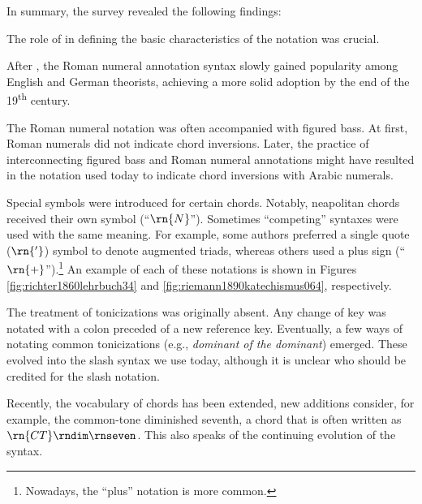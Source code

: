 In summary, the survey revealed the following findings:

The role of \textcite{weber1818versuch} in defining the
basic characteristics of the notation was crucial.


After \textcite{weber1818versuch}, the Roman numeral
annotation syntax slowly gained popularity among English and
German theorists, achieving a more solid adoption by the end
of the 19\textsuperscript{th} century.

 The Roman numeral notation was often accompanied with
figured bass. At first, Roman numerals did not indicate
chord inversions. Later, the practice of interconnecting
figured bass and Roman numeral annotations might have
resulted in the notation used today to indicate chord
inversions with Arabic numerals.

Special symbols were introduced for certain chords. Notably,
\gls{neapolitan} chords received their own symbol
(``$\rn{N}$''). Sometimes ``competing'' syntaxes were used
with the same meaning. For example, some authors preferred a
single quote ($\rn{'}$) symbol to denote augmented triads,
whereas others used a plus sign
(``$\rn{+}$'').\footnote{Nowadays, the ``plus'' notation is
more common.} An example of each of these notations is shown
in Figures \ref{fig:richter1860lehrbuch34} and
\ref{fig:riemann1890katechismus064}, respectively.

The treatment of tonicizations was originally absent. Any
change of key was notated with a colon preceded of a new
reference key. Eventually, a few ways of notating common
tonicizations (e.g., \emph{dominant of the dominant})
emerged. These evolved into the slash syntax we use today,
although it is unclear who should be credited for the slash
notation.

Recently, the vocabulary of chords has been extended, new
additions consider, for example, the common-tone diminished
seventh, a chord that is often written as
$\rn{CT}\rndim\rnseven$. This also speaks of the continuing
evolution of the syntax.
